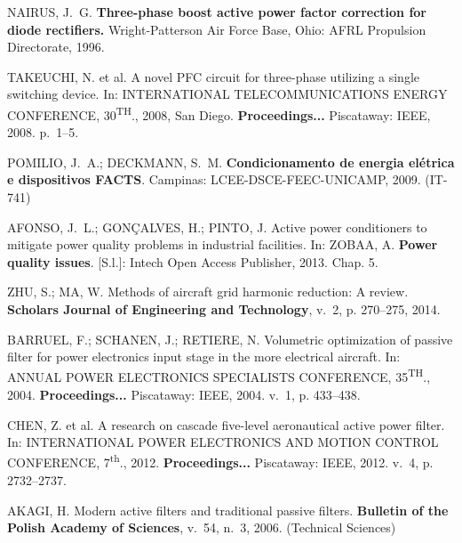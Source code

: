 \begin{thebibliography}{}
{NAIRUS, J.~G. \textbf{Three-phase boost active power factor correction for diode
  rectifiers.} Wright-Patterson Air Force Base,
  Ohio: AFRL Propulsion Directorate, 1996.}

{TAKEUCHI, N. et al. A novel PFC circuit for three-phase utilizing a single
  switching device. In: \uppercase{International Telecommunications
  Energy Conference, 30\textsuperscript{\lowercase{th}}.,} 2008, San Diego. \textbf{Proceedings...} 
  Piscataway: IEEE, 2008. p.~1--5.}

{POMILIO, J.~A.; DECKMANN, S.~M. \textbf{Condicionamento de energia el{\'e}trica
  e dispositivos FACTS}. Campinas: LCEE-DSCE-FEEC-UNICAMP, 2009. (IT-741)}

{AFONSO, J.~L.; GON{\c{C}}ALVES, H.; PINTO, J. Active power conditioners to
	 mitigate power quality problems in industrial facilities.
	 In: ZOBAA, A. \textbf{Power quality issues}.
     [S.l.]: Intech Open Access Publisher, 2013. Chap. 5.}

{ZHU, S.; MA, W. Methods of aircraft grid harmonic reduction: A review.
\textbf{Scholars Journal of Engineering and Technology}, v.~2, p.
  270--275, 2014.}

{BARRUEL, F.; SCHANEN, J.; RETIERE, N. Volumetric optimization of passive
  filter for power electronics input stage in the more electrical aircraft. In:
  \uppercase{Annual Power Electronics Specialists Conference, 35\textsuperscript{\lowercase{th}}., 2004.}
  \textbf{Proceedings...} Piscataway: IEEE, 2004. v.~1, p. 433--438.}

{CHEN, Z. et al. A research on cascade five-level aeronautical active power
  filter. In: \uppercase{International Power Electronics and Motion
  Control Conference,} 7\textsuperscript{th}., 2012. \textbf{Proceedings...} Piscataway: IEEE, 2012. v.~4, p. 2732--2737.}

{AKAGI, H. Modern active filters and traditional passive filters.
\textbf{Bulletin of the Polish Academy of Sciences}, v.~54,
  n.~3, 2006. (Technical Sciences)}


\end{thebibliography}
